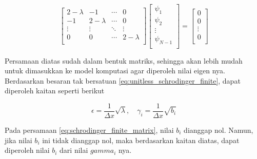\begin{equation} \label{eq:schrodinger_finite_matrix}
	\begin{bmatrix}
		2 - \lambda & -1          & \cdots & 0           \\
		-1          & 2 - \lambda & \cdots & 0           \\
		\vdots      & \vdots      & \ddots & \vdots      \\
		0           & 0           & \cdots & 2 - \lambda \\
	\end{bmatrix}
	\begin{bmatrix}
		\psi_1     \\
		\psi_2     \\
		\vdots     \\
		\psi_{N-1} \\
	\end{bmatrix}
	= \begin{bmatrix}
		0      \\
		0      \\
		\vdots \\
		0      \\
	\end{bmatrix}
\end{equation}

\noindent
Persamaan diatas sudah dalam bentuk matriks, sehingga akan lebih mudah untuk dimasukkan ke model komputasi agar diperoleh nilai eigen nya. Berdasarkan besaran tak bersatuan \ref{eq:unitless_schrodinger_finite}, dapat diperoleh kaitan seperti berikut

\begin{equation}
	\epsilon = \frac{1}{\Delta x} \sqrt{\lambda}, \quad \gamma_i = \frac{1}{\Delta x} \sqrt{b_i}
\end{equation}

\noindent
Pada persamaan \ref{eq:schrodinger_finite_matrix}, nilai $b_i$ dianggap nol. Namun, jika nilai $b_i$ ini tidak dianggap nol, maka berdasarkan kaitan diatas, dapat diperoleh nilai $b_i$ dari nilai $gamma_i$ nya.



